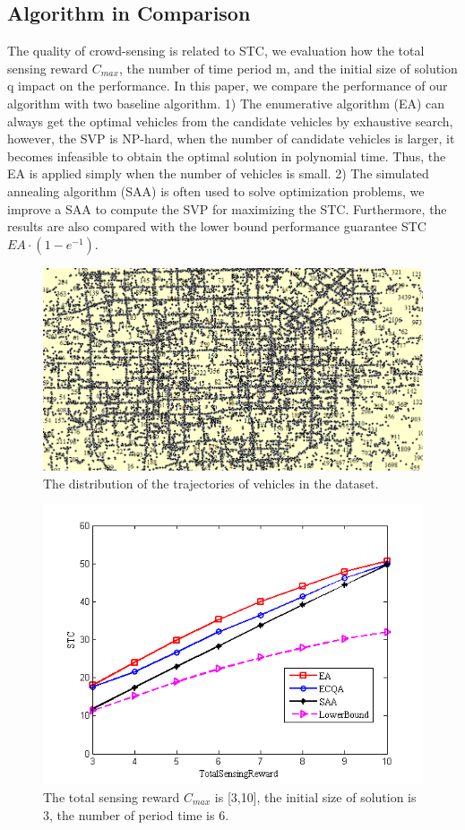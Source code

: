 \documentclass[journal]{IEEEtran}
\begin{document}
\subsection{Algorithm in Comparison}
The quality of crowd-sensing is related to STC, we evaluation how the total sensing reward $C_{max}$, the number of time period m, and the initial size of solution q impact on the performance. In this paper, we compare the performance of our algorithm with two baseline algorithm. 1) The enumerative algorithm (EA) can always get the optimal vehicles from the candidate vehicles by exhaustive search, however, the SVP is NP-hard, when the number of candidate vehicles is larger, it becomes infeasible to obtain the optimal solution in polynomial time. Thus, the EA is applied simply when the number of vehicles is small. 2) The simulated annealing algorithm (SAA) is often used to solve optimization problems, we improve a SAA to compute the SVP for maximizing the STC. Furthermore, the results are also compared with the lower bound performance guarantee STC $EA\cdot(1-e^{-1})$.
\begin{figure}
	\centering
	\includegraphics[width=1\linewidth]{fig3-1.png}
	\caption{The distribution of the trajectories of vehicles in the dataset.}
	\label{fig:figure4}
\end{figure}
\begin{figure}
	\centering
	\includegraphics[width=1\linewidth]{Fig4(a).png}
	\caption{The total sensing reward $C_{max}$ is [3,10], the initial size of solution is 3, the number of period time is 6.}
	\label{fig:figure4}
\end{figure}
\end{document}

